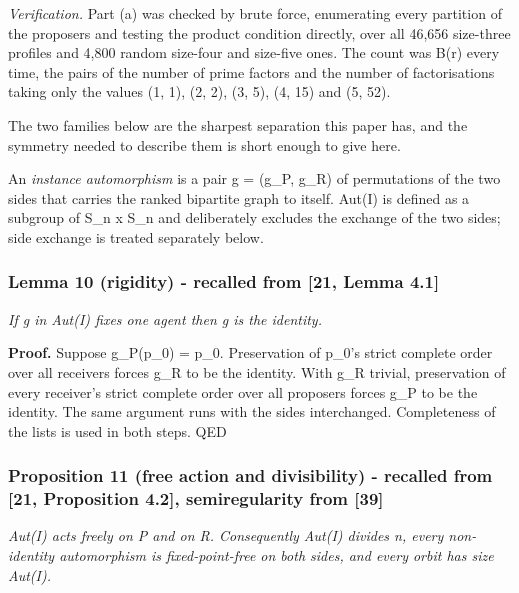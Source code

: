 \documentclass[
  11pt,
]{article}
\begin{document}
\emph{Verification.} Part (a) was checked by brute force, enumerating
every partition of the proposers and testing the product condition
directly, over all 46,656 size-three profiles and 4,800 random size-four
and size-five ones. The count was B(r) every time, the pairs of the
number of prime factors and the number of factorisations taking only the
values (1, 1), (2, 2), (3, 5), (4, 15) and (5, 52).

The two families below are the sharpest separation this paper has, and
the symmetry needed to describe them is short enough to give here.

An \emph{instance automorphism} is a pair g = (g\_P, g\_R) of
permutations of the two sides that carries the ranked bipartite graph to
itself. Aut(I) is defined as a subgroup of S\_n x S\_n and deliberately
excludes the exchange of the two sides; side exchange is treated
separately below.

\hypertarget{lemma-10-rigidity---recalled-from-21-lemma-4.1}{%
\subsubsection{Lemma 10 (rigidity) - recalled from {[}21, Lemma
4.1{]}}\label{lemma-10-rigidity---recalled-from-21-lemma-4.1}}

\emph{If g in Aut(I) fixes one agent then g is the identity.}

\textbf{Proof.} Suppose g\_P(p\_0) = p\_0. Preservation of p\_0's strict
complete order over all receivers forces g\_R to be the identity. With
g\_R trivial, preservation of every receiver's strict complete order
over all proposers forces g\_P to be the identity. The same argument
runs with the sides interchanged. Completeness of the lists is used in
both steps. QED

\hypertarget{proposition-11-free-action-and-divisibility---recalled-from-21-proposition-4.2-semiregularity-from-39}{%
\subsubsection{Proposition 11 (free action and divisibility) - recalled
from {[}21, Proposition 4.2{]}, semiregularity from
{[}39{]}}\label{proposition-11-free-action-and-divisibility---recalled-from-21-proposition-4.2-semiregularity-from-39}}

\emph{Aut(I) acts freely on P and on R. Consequently
\textbar Aut(I)\textbar{} divides n, every non-identity automorphism is
fixed-point-free on both sides, and every orbit has size
\textbar Aut(I)\textbar.}
\end{document}

